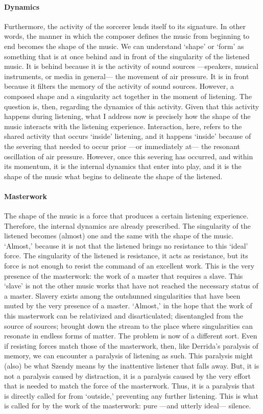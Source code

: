 \paragraph{Dynamics}
Furthermore, the activity of the sorcerer lends itself to its signature. In other words, the manner in which the composer defines the music from beginning to end becomes the shape of the music. We can understand `shape' or `form' as something that is at once behind and in front of the singularity of the listened music. It is behind because it is the activity of sound sources ---speakers, musical instruments, or media in general--- the movement of air pressure. It is in front because it filters the memory of the activity of sound sources. However, a composed shape and a singularity act together in the moment of listening. The question is, then, regarding the dynamics of this activity. Given that this activity happens during listening, what I address now is precisely how the shape of the music interacts with the listening experience. Interaction, here, refers to the shared activity that occurs `inside' listening, and it happens `inside' because of the severing that needed to occur prior ---or immediately at--- the resonant oscillation of air pressure. However, once this severing has occurred, and within its momentum, it is the internal dynamics that enter into play, and it is the shape of the music what begins to delineate the shape of the listened.

\paragraph{Masterwork}
The shape of the music is a force that produces a certain listening experience. Therefore, the internal dynamics are already prescribed. The singularity of the listened becomes (almost) one and the same with the shape of the music. `Almost,' because it is not that the listened brings no resistance to this `ideal' force. The singularity of the listened is resistance, it acts as resistance, but its force is not enough to resist the command of an excellent work. This is the very presence of the masterwork: the work of a master that requires a slave. This `slave' is not the other music works that have not reached the necessary status of a master. Slavery exists among the outshunned singularities that have been muted by the very presence of a master. `Almost,' in the hope that the work of this masterwork can be relativized and disarticulated; disentangled from the source of sources; brought down the stream to the place where singularities can resonate in endless forms of matter. The problem is now of a different sort. Even if resisting forces match those of the masterwork, then, like Derrida's paralysis of memory, we can encounter a paralysis of listening as such. This paralysis might (also) be what Szendy means by the inattentive listener that falls away. But, it is not a paralysis caused by distraction, it is a paralysis caused by the very effort that is needed to match the force of the masterwork. Thus, it is a paralysis that is directly called for from `outside,' preventing any further listening. This is what is called for by the work of the masterwork: pure ---and utterly ideal--- silence.

